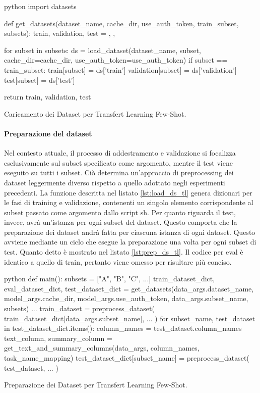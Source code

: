 \documentclass[12pt,a4paper,twoside,openright]{book}
\begin{document}
\begin{customcode}
\begin{mintedbox}{python}
import datasets 

def get_datasets(dataset_name, cache_dir, use_auth_token, train_subset, subsets):
    train, validation, test = {}, {}, {}

    for subset in subsets:
        ds = load_dataset(dataset_name, subset, cache_dir=cache_dir, use_auth_token=use_auth_token)
        if subset == train_subset:
            train[subset] = ds['train']
            validation[subset] = ds['validation']
        test[subset] = ds['test']

    return train, validation, test
\end{mintedbox}
\caption{Caricamento dei Dataset per Transfert Learning Few-Shot.}
\label{lst:load_ds_tl}
\end{customcode}

\paragraph{Preparazione del dataset}
Nel contesto attuale, il processo di addestramento e validazione si focalizza esclusivamente sul subset specificato come argomento, mentre il test viene eseguito su tutti i subset. Ciò determina un'approccio di preprocessing dei dataset leggermente diverso rispetto a quello adottato negli esperimenti precedenti. La funzione descritta nel listato \ref{lst:load_ds_tl} genera dizionari per le fasi di training e validazione, contenenti un singolo elemento corrispondente al subset passato come argomento dallo script sh. Per quanto riguarda il test, invece, avrà un'istanza per ogni subset del dataset. 
Questo comporta che la preparazione dei dataset andrà fatta per ciascuna istanza di ogni dataset. Questo avviene mediante un ciclo che esegue la preparazione una volta per ogni subset di test. Quanto detto è mostrato nel listato \ref{lst:prep_ds_tl}. Il codice per eval è identico a quello di train, pertanto viene omesso per risultare più conciso.

\begin{customcode}
\begin{mintedbox}{python}
def main():
    subsets = ["A", "B", "C", ...]
    train_dataset_dict, eval_dataset_dict, test_dataset_dict = get_datasets(data_args.dataset_name, model_args.cache_dir, model_args.use_auth_token, data_args.subset_name, subsets)
    ...
    train_dataset = preprocess_dataset(
        train_dataset_dict[data_args.subset_name],
        ...
    ) 
    for subset_name, test_dataset in test_dataset_dict.items(): 
        column_names = test_dataset.column_names
        text_column, summary_column = get_text_and_summary_columns(data_args, column_names, task_name_mapping)
        test_dataset_dict[subset_name] = preprocess_dataset(
            test_dataset,
            ...
        )  
\end{mintedbox}
\caption{Preparazione dei Dataset per Transfert Learning Few-Shot.}
\label{lst:prep_ds_tl}
\end{customcode}
\end{document}
